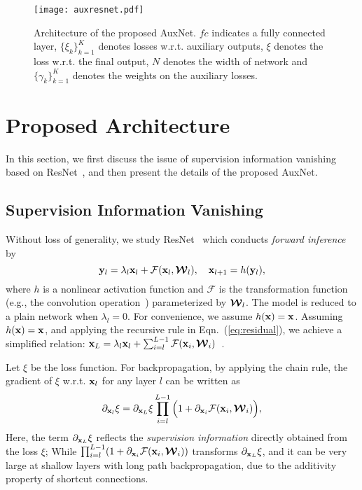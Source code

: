 \documentclass[10pt,onecolumn,letterpaper]{article}
\def\mF{{\mathcal F}}
\def\bmW{\mbox{\boldmath${\mathcal W}$}}
\def\bx{{\bf x}}
\def\by{{\bf y}}
\def\SexyName{AuxNet\xspace}
\begin{document}
\begin{figure}[t]
\begin{center}
   \texttt{[image: auxresnet.pdf]}
\end{center}
   \caption{Architecture of the proposed \SexyName. $fc$ indicates a fully connected layer, $\{\xi_k\}_{k=1}^{K}$ denotes losses w.r.t. auxiliary outputs, $\xi$ denotes the loss w.r.t. the final output, $N$ denotes the width of network and $\{\gamma_k\}_{k=1}^K$ denotes the weights on the auxiliary losses.}
\label{fig:ausresnet}
\vspace{-1em}
\end{figure}
\section{Proposed Architecture}\label{sec:model_structure}
In this section, we first discuss the issue of supervision information vanishing based on ResNet~\cite{he2015deep}, and then present the details of the proposed \SexyName.
\subsection{Supervision Information Vanishing}\label{sec:SIV}
Without loss of generality, we study ResNet~\cite{he2015deep} which
conducts \emph{forward inference} by
 \begin{equation}\label{eq:residual}
 \by_{l} = \lambda_l {\bx_l} + \mF({\bx_l},{{\bmW}_l}), ~~~\bx_{l + 1} = h(\by_{l}),
 \end{equation}
where $h$ is a nonlinear activation function and $\mF$ is the transformation function (e.g.,  the convolution operation~\cite{romero2014fitnets})
parameterized by $\bmW_l$. The model is reduced to a plain network when $\lambda_l=0$. For convenience, we assume $h(\bx) = \bx$.
Assuming $h(\bx) = \bx$, and applying the recursive rule in Eqn.~(\ref{eq:residual}), we achieve a simplified relation:
${\bx_L} = \lambda_l{\bx_l} + \sum_{i = l}^{L - 1} { \mF(\bx_i,\bmW_i) }$~\cite{he2016identity}.


Let $\xi$ be the loss function. For backpropagation, by applying the chain rule,  the gradient of $\xi$ w.r.t. $\bx_l$  for any layer $l$  can be written as
\begin{equation}\label{eq:gradient_resnet}
{{\partial_{\bx_l} \xi }} = {\partial_{\bx_{L}} \xi }  \prod\limits_{i = l}^{L - 1} \Big( {1 + \partial_{\bx_i}  {\mF({\bx_i},{{\bmW}_i})}} \Big),
\end{equation}
Here, the term ${\partial_{\bx_{L}} \xi }$ reflects the {\em supervision information} directly obtained from the loss $\xi$; While $\prod_{i = l}^{L - 1} ( {1 + \partial_{\bx_i}  {\mF({\bx_i},{{\bmW}_i})}} )$ transforms $\partial_{\bx_{L}} \xi$, and it can be very large at shallow layers with long path backpropagation, due to the additivity property of shortcut connections.
\end{document}
